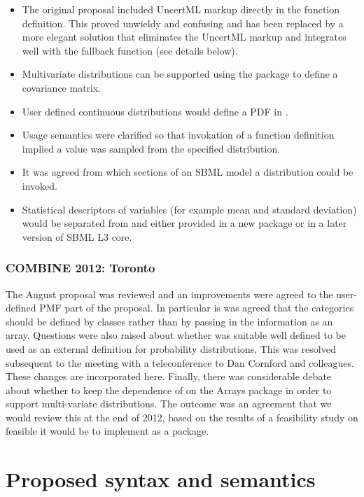 \documentclass[draftspec]{sbmlpkgspec}
\begin{document}
\begin{itemize}
\item The original proposal included UncertML markup directly in the
  function definition. This proved unwieldy and confusing and has been
  replaced by a more elegant solution that eliminates the UncertML
  markup and integrates well with the fallback function (see details
  below).
\item Multivariate distributions can be supported using the \arrays
  package to define a covariance matrix.
\item User defined continuous distributions would define a PDF in
  \mathml.
\item Usage semantics were clarified so that invokation of a function
  definition implied a value was sampled from the specified
  distribution.
\item It was agreed from which sections of an SBML model a
  distribution could be invoked.
\item Statistical descriptors of variables (for
  example mean and standard deviation) would be separated from
  \distrib and either provided in a new package or in a later version
  of SBML L3 core.
\end{itemize}

\subsubsection{COMBINE 2012: Toronto}

The August proposal was reviewed and an improvements were agreed to
the user-defined PMF part of the proposal. In particular is was agreed
that the categories should be defined by \distribshort classes rather
than by passing in the information as an array. Questions were also raised
about whether \uncertml was suitable well defined to be used as an
external definition for probability distributions. This was resolved
subsequent to the meeting with a teleconference to Dan Cornford and
colleagues. These changes are incorporated here. Finally, there was
considerable debate about whether to keep the dependence of
\distribshort on the Arrays package in order to support multi-variate
distributions. The outcome was an agreement that we would review this
at the end of 2012, based on the results of a feasibility study on
feasible it would be to implement \arrays as a package.

\section{Proposed syntax and semantics}
\end{document}

